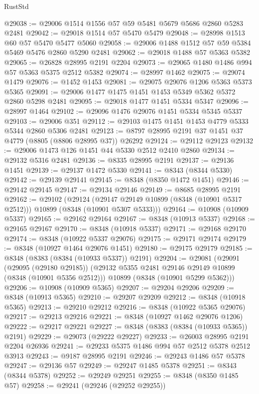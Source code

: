 \begin{lexlean}{RustStd}
\begin{coremodule}
@29038 := @29006 @1514 @1556 @57 @59 @5481 @5679 @5686 @2860 @5283 @2481
@29042 := @29018 @1514 @57 @5470 @5479
@29048 := @28998 @1513 @60 @57 @5470 @5477 @5060
@29058 := @29006 @1488 @1512 @57 @59 @5384 @5469 @5476 @2860 @5290 @2481
@29062 := @29018 @1488 @57 @5363 @5382
@29065 := @26828 @28995 @2191 @2204
@29073 := @29065 @1480 @1486 @994 @57 @5363 @5375 @2512 @5382
@29074 := @28997 @1462
@29075 := @29074 @1479
@29076 := @1452 @1453
@29081 := @29075 @29076 @1206 @5363 @5373 @5365
@29091 := @29006 @1477 @1475 @1451 @1453 @5349 @5362 @5372 @2860 @5298 @2481
@29095 := @29018 @1477 @1451 @5334 @5347
@29096 := @28997 @1464
@29102 := @29096 @1476 @29076 @1451 @5334 @5345 @5337
@29103 := @29006 @351
@29112 := @29103 @1475 @1451 @1453 @4779 @5333 @5344 @2860 @5306 @2481
@29123 := @8797 @28995 @2191 @37 @1451 @37 @4779 (@8805 (@8806 @28995 @37)) @26292
@29124 := @29112 @29123
@29132 := @29006 @1473 @126 @1451 @44 @5330 @2512 @2410 @2860
@29134 := @29132 @5316 @2481
@29136 := @8335 @28995 @2191
@29137 := @29136 @1451
@29139 := @29137 @1472 @5330
@29141 := @8343 (@8344 @5330)
@29142 := @29139 @29141
@29145 := @8348 (@8350 @1472 @1451)
@29146 := @29142 @29145
@29147 := @29134 @29146
@29149 := @8685 @28995 @2191
@29162 := @29102
    (@29124 (@29147 @29149 @10899 (@8348 (@10901 @5317 @2512))) @10899 (@8348 (@10901 @5307 @5333)))
@29164 := @10908 (@10909 @5337)
@29165 := @29162 @29164
@29167 := @8348 (@10913 @5337)
@29168 := @29165 @29167
@29170 := @8348 (@10918 @5337)
@29171 := @29168 @29170
@29174 := @8348 (@10922 @5337 @29076)
@29175 := @29171 @29174
@29179 := @8348 (@10927 @1464 @29076 @1451)
@29180 := @29175 @29179
@29185 := @8348 (@8383 (@8384 (@10933 @5337)) @2191)
@29204 := @29081
    (@29091
      (@29095 (@29180 @29185))
      (@29132 @5355 @2481 @29146 @29149 @10899 (@8348 (@10901 @5356 @2512)))
      @10899
      (@8348 (@10901 @5299 @5362)))
@29206 := @10908 (@10909 @5365)
@29207 := @29204 @29206
@29209 := @8348 (@10913 @5365)
@29210 := @29207 @29209
@29212 := @8348 (@10918 @5365)
@29213 := @29210 @29212
@29216 := @8348 (@10922 @5365 @29076)
@29217 := @29213 @29216
@29221 := @8348 (@10927 @1462 @29076 @1206)
@29222 := @29217 @29221
@29227 := @8348 (@8383 (@8384 (@10933 @5365)) @2191)
@29229 := @29073 (@29222 @29227)
@29233 := @26003 @28995 @2191 @2204 @26936
@29241 := @29233 @5375 @1486 @994 @57 @2512 @5378 @2512 @3913
@29243 := @9187 @28995 @2191
@29246 := @29243 @1486 @57 @5378
@29247 := @29136 @57
@29249 := @29247 @1485 @5378
@29251 := @8343 (@8344 @5378)
@29252 := @29249 @29251
@29255 := @8348 (@8350 @1485 @57)
@29258 := @29241 (@29246 (@29252 @29255))

\end{coremodule}
\end{lexlean}
